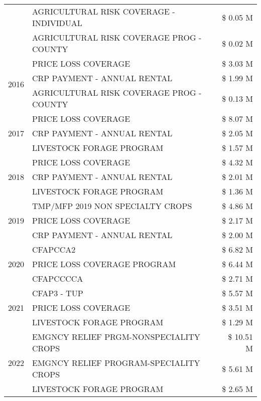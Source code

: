 \begin{tabular}{llr}
 & AGRICULTURAL RISK COVERAGE - INDIVIDUAL & \$ 0.05 M \\
 & AGRICULTURAL RISK COVERAGE PROG - COUNTY & \$ 0.02 M \\
\cline{1-3}
\multirow[t]{3}{*}{2016} & PRICE LOSS COVERAGE & \$ 3.03 M \\
 & CRP PAYMENT - ANNUAL RENTAL & \$ 1.99 M \\
 & AGRICULTURAL RISK COVERAGE PROG - COUNTY & \$ 0.13 M \\
\cline{1-3}
\multirow[t]{3}{*}{2017} & PRICE LOSS COVERAGE & \$ 8.07 M \\
 & CRP PAYMENT - ANNUAL RENTAL & \$ 2.05 M \\
 & LIVESTOCK FORAGE PROGRAM & \$ 1.57 M \\
\cline{1-3}
\multirow[t]{3}{*}{2018} & PRICE LOSS COVERAGE & \$ 4.32 M \\
 & CRP PAYMENT - ANNUAL RENTAL & \$ 2.01 M \\
 & LIVESTOCK FORAGE PROGRAM & \$ 1.36 M \\
\cline{1-3}
\multirow[t]{3}{*}{2019} & TMP/MFP 2019 NON SPECIALTY CROPS & \$ 4.86 M \\
 & PRICE LOSS COVERAGE & \$ 2.17 M \\
 & CRP PAYMENT - ANNUAL RENTAL & \$ 2.00 M \\
\cline{1-3}
\multirow[t]{3}{*}{2020} & CFAPCCA2 & \$ 6.82 M \\
 & PRICE LOSS COVERAGE PROGRAM & \$ 6.44 M \\
 & CFAPCCCCA & \$ 2.71 M \\
\cline{1-3}
\multirow[t]{3}{*}{2021} & CFAP3 - TUP & \$ 5.57 M \\
 & PRICE LOSS COVERAGE & \$ 3.51 M \\
 & LIVESTOCK FORAGE PROGRAM & \$ 1.29 M \\
\cline{1-3}
\multirow[t]{3}{*}{2022} & EMGNCY RELIEF PRGM-NONSPECIALITY CROPS & \$ 10.51 M \\
 & EMGNCY RELIEF PROGRAM-SPECIALITY CROPS & \$ 5.61 M \\
 & LIVESTOCK FORAGE PROGRAM & \$ 2.65 M \\
\cline{1-3}
\bottomrule
\end{tabular}

